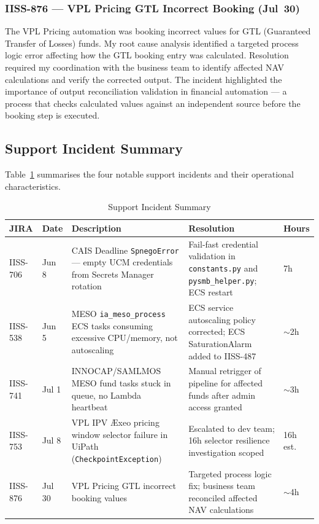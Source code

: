 \subsubsection{IISS-876 --- VPL Pricing GTL Incorrect Booking (Jul~30)}

The VPL Pricing automation was booking incorrect values for GTL
(Guaranteed Transfer of Losses) funds. My root cause analysis identified a
targeted process logic error affecting how the GTL booking entry was calculated.
Resolution required my coordination with the business team to identify affected
NAV calculations and verify the corrected output. The incident highlighted the
importance of output reconciliation validation in financial automation ---
a process that checks calculated values against an independent source before
the booking step is executed.

\subsection{Support Incident Summary}

Table~\ref{tab:support_incidents} summarises the four notable support incidents
and their operational characteristics.

\begin{table}[ht]
\centering
\caption{Support Incident Summary}
\label{tab:support_incidents}
\begin{tabular}{p{1.6cm}p{1.5cm}p{4.0cm}p{4.5cm}p{1.0cm}}
\toprule
\textbf{JIRA} & \textbf{Date} & \textbf{Description} & \textbf{Resolution} & \textbf{Hours} \\
\midrule
IISS-706 & Jun 8 & CAIS Deadline \texttt{SpnegoError} --- empty UCM credentials from Secrets Manager rotation & Fail-fast credential validation in \texttt{constants.py} and \texttt{pysmb\_helper.py}; ECS restart & 7h \\
\midrule
IISS-538 & Jun 5 & MESO \texttt{ia\_meso\_process} ECS tasks consuming excessive CPU/memory, not autoscaling & ECS service autoscaling policy corrected; ECS SaturationAlarm added to IISS-487 & $\sim$2h \\
\midrule
IISS-741 & Jul 1 & INNOCAP/SAMLMOS MESO fund tasks stuck in queue, no Lambda heartbeat & Manual retrigger of pipeline for affected funds after admin access granted & $\sim$3h \\
\midrule
IISS-753 & Jul 8 & VPL IPV \AE xeo pricing window selector failure in UiPath (\texttt{CheckpointException}) & Escalated to dev team; 16h selector resilience investigation scoped & 16h est. \\
\midrule
IISS-876 & Jul 30 & VPL Pricing GTL incorrect booking values & Targeted process logic fix; business team reconciled affected NAV calculations & $\sim$4h \\
\bottomrule
\end{tabular}
\end{table}

